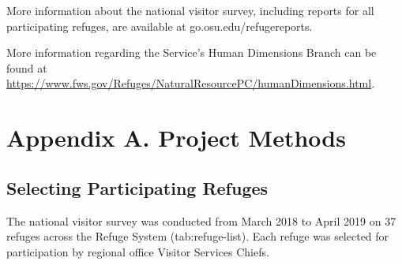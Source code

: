 \documentclass[]{book}
\begin{document}
More information about the national visitor survey, including reports
for all participating refuges, are available at
go.osu.edu/refugereports.

More information regarding the Service's Human Dimensions Branch can be
found at
\url{https://www.fws.gov/Refuges/NaturalResourcePC/humanDimensions.html}.

\appendix


\chapter*{Appendix A. Project
Methods}\label{appendix-a.-project-methods}

\section{Selecting Participating
Refuges}\label{selecting-participating-refuges}

The national visitor survey was conducted from March 2018 to April 2019
on 37 refuges across the Refuge System (tab:refuge-list). Each refuge
was selected for participation by regional office Visitor Services
Chiefs.
\end{document}
